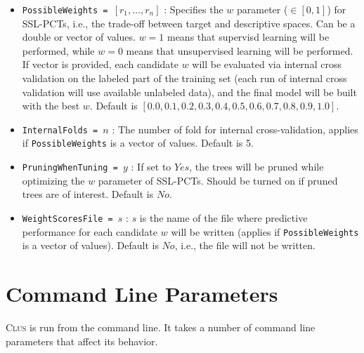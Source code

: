 \documentclass[a4paper]{report}
\newcommand{\clus}{\textsc{Clus}}
\begin{document}
\begin{itemize}
\item {\tt PossibleWeights = $\left[ r_1, \ldots, r_n\right]$} : Specifies the $w$ parameter ($\in [0,1]$) for SSL-PCTs, i.e., the trade-off between target and descriptive spaces. Can be a double or vector of values. $w=1$ means that supervisd learning will be performed, while $w=0$ means that unsupervised learning will be performed. If vector is provided, each candidate $w$ will be evaluated via internal cross validation on the labeled part of the training set (each run of internal cross validation will use available unlabeled data), and the final model will be built with the best $w$. Default is $[0.0,0.1,0.2,0.3,0.4,0.5,0.6,0.7,0.8,0.9,1.0]$.
\item {\tt InternalFolds = $n$} : The number of fold for internal cross-validation, applies if {\tt PossibleWeights} is a vector of values. Default is 5.
\item {\tt PruningWhenTuning = $y$} : If set to $Yes$, the trees will be pruned while optimizing the $w$ parameter of SSL-PCTs. Should be turned on if pruned trees are of interest. Default is $No$.
\item {\tt WeightScoresFile = $s$} : $s$ is the name of the file where predictive performance for each candidate $w$ will be written (applies if {\tt PossibleWeights} is a vector of values). Default is $No$, i.e., the file will not be written.
\end{itemize}



\chapter{Command Line Parameters}
\label{param:ch}

\clus{} is run from the command line.  It takes a number of command line parameters that affect its behavior.
\end{document}
